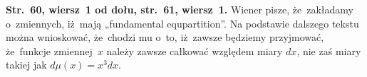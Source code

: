 \documentclass[a4paper,11pt]{article}
\numberwithin{equation}{section}
\begin{document}
\VerSpaceFour





\noindent
\textbf{Str.~60, wiersz~1 od dołu, str.~61, wiersz~1.} Wiener pisze,
że~zakładamy o~zmiennych, iż~mają „fundamental equpartition”. Na podstawie
dalszego tekstu można wnioskować, że~chodzi mu o~to, iż~zawsze będziemy
przyjmować, że~funkcje zmiennej~$x$ należy zawsze całkować względem miary
$dx$, nie zaś miary takiej jak $d\mu( x ) = x^{ 3 } dx$.

\VerSpaceFour























\end{document}
